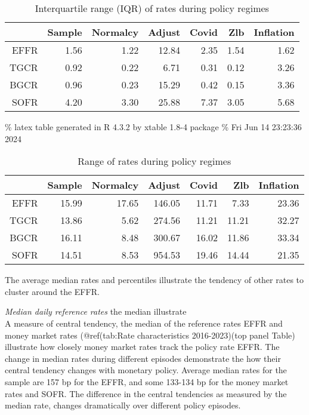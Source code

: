 \documentclass[
]{article}
\begin{document}
\begin{table}[ht]
\centering
\begin{tabular}{rrrrrrr}
  \hline
 & Sample & Normalcy & Adjust & Covid & Zlb & Inflation \\ 
  \hline
EFFR & 1.56 & 1.22 & 12.84 & 2.35 & 1.54 & 1.62 \\ 
  TGCR & 0.92 & 0.22 & 6.71 & 0.31 & 0.12 & 3.26 \\ 
  BGCR & 0.96 & 0.23 & 15.29 & 0.42 & 0.15 & 3.36 \\ 
  SOFR & 4.20 & 3.30 & 25.88 & 7.37 & 3.05 & 5.68 \\ 
   \hline
\end{tabular}
\caption{Interquartile range (IQR) of rates during policy regimes} 
\end{table}

\% latex table generated in R 4.3.2 by xtable 1.8-4 package
\% Fri Jun 14 23:23:36 2024

\begin{table}[ht]
\centering
\begin{tabular}{rrrrrrr}
  \hline
 & Sample & Normalcy & Adjust & Covid & Zlb & Inflation \\ 
  \hline
EFFR & 15.99 & 17.65 & 146.05 & 11.71 & 7.33 & 23.36 \\ 
  TGCR & 13.86 & 5.62 & 274.56 & 11.21 & 11.21 & 32.27 \\ 
  BGCR & 16.11 & 8.48 & 300.67 & 16.02 & 11.86 & 33.34 \\ 
  SOFR & 14.51 & 8.53 & 954.53 & 19.46 & 14.44 & 21.35 \\ 
   \hline
\end{tabular}
\caption{Range of rates during policy regimes} 
\end{table}

The average median rates and percentiles illustrate the tendency of other rates to cluster around the EFFR.

\emph{Median daily reference rates}
the median illustrate\\
A measure of central tendency, the median of the reference rates EFFR and money market rates (@ref(tab:Rate characteristics 2016-2023)(top panel Table) illustrate how closely money market rates track the policy rate EFFR. The change in median rates during different episodes demonstrate the how their central tendency changes with monetary policy. Average median rates for the sample are 157 bp for the EFFR, and some 133-134 bp for the money market rates and SOFR. The difference in the central tendencies as measured by the median rate, changes dramatically over different policy episodes.
\end{document}
